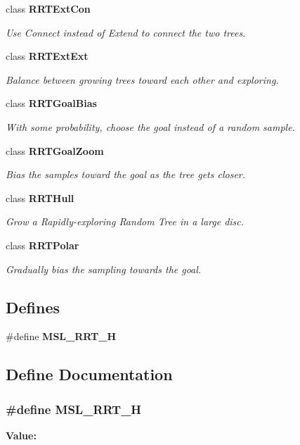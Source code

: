 \begin{CompactItemize}
class {\bf RRTExt\-Con}
\begin{CompactList}\small\item\em Use Connect instead of Extend to connect the two trees.\item\end{CompactList}\item 
class {\bf RRTExt\-Ext}
\begin{CompactList}\small\item\em Balance between growing trees toward each other and exploring.\item\end{CompactList}\item 
class {\bf RRTGoal\-Bias}
\begin{CompactList}\small\item\em With some probability, choose the goal instead of a random sample.\item\end{CompactList}\item 
class {\bf RRTGoal\-Zoom}
\begin{CompactList}\small\item\em Bias the samples toward the goal as the tree gets closer.\item\end{CompactList}\item 
class {\bf RRTHull}
\begin{CompactList}\small\item\em Grow a Rapidly-exploring Random Tree in a large disc.\item\end{CompactList}\item 
class {\bf RRTPolar}
\begin{CompactList}\small\item\em Gradually bias the sampling towards the goal.\item\end{CompactList}\end{CompactItemize}
\subsection*{Defines}
\begin{CompactItemize}
\item 
\#define {\bf MSL\_\-RRT\_\-H}
\end{CompactItemize}


\subsection{Define Documentation}
\subsubsection{\setlength{\rightskip}{0pt plus 5cm}\#define MSL\_\-RRT\_\-H}\label{rrt_8h_a0}


{\bf Value:}\footnotesize\begin{verbatim}
\end{verbatim}\normalsize 

